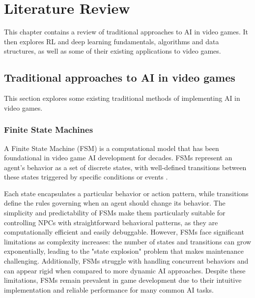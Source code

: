 \chapter{Literature Review}

This chapter contains a review of traditional approaches to AI in video games.
It then explores RL and deep learning fundamentals, algorithms and data structures, as well as some of their existing applications to video games.

\section{Traditional approaches to AI in video games}

This section explores some existing traditional methods of implementing AI in video games.

\subsection{Finite State Machines}

A Finite State Machine (FSM) is a computational model that has been foundational in video game AI development for decades. 
FSMs represent an agent's behavior as a set of discrete states, with well-defined transitions between these states triggered by specific conditions or events \cite{spiceworks_fsm}. 


Each state encapsulates a particular behavior or action pattern, while transitions define the rules governing when an agent should change its behavior. 
The simplicity and predictability of FSMs make them particularly suitable for controlling NPCs with straightforward behavioral patterns, as they are computationally efficient and easily debuggable.
However, FSMs face significant limitations as complexity increases: the number of states and transitions can grow exponentially, leading to the "state explosion" problem that makes maintenance challenging.
Additionally, FSMs struggle with handling concurrent behaviors and can appear rigid when compared to more dynamic AI approaches. 
Despite these limitations, FSMs remain prevalent in game development due to their intuitive implementation and reliable performance for many common AI tasks.

